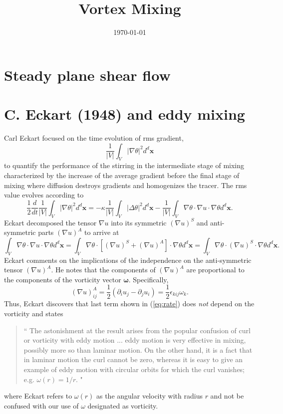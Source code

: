 \documentclass[12pt]{article}
\begin{document}
\title{Vortex Mixing}
\author{}
\date{\today}

\maketitle
\section{Steady plane shear flow}
\section{C. Eckart (1948) and eddy mixing}
Carl Eckart \cite{Eckart1948} focused on the time evolution of rms gradient,
\begin{equation}
\frac{1}{|V|}\int_{V} |\nabla \theta |^{2} d^{d}\mathbf{x}
\end{equation}
to quantify the performance of the stirring in the intermediate stage of mixing characterized by the increase of the average gradient before the final stage of mixing where diffusion destroys gradients and homogenizes the tracer. The rms value evolves according to 
\begin{equation}
\label{eq:rate}
\frac{1}{2}\frac{d}{dt}\frac{1}{|V|}\int_{V} |\nabla \theta |^{2} d^{d}\mathbf{x} = - \kappa \frac{1}{|V|} \int_{V} |\Delta \theta |^{2} d^{d}\mathbf{x}  - \frac{1}{|V|} \int_{V} \nabla \theta \cdot \nabla u \cdot \nabla \theta  d^{d}\mathbf{x}.
\end{equation}
Eckart decomposed the tensor $\nabla u$  into its symmetric $(\nabla u)^{S}$ and anti-symmetric parts $(\nabla u)^{A}$ to arrive at
\begin{equation}
  \int_{V} \nabla \theta \cdot \nabla u \cdot \nabla \theta  d^{d}\mathbf{x} =   \int_{V} \nabla \theta \cdot [(\nabla u)^{S} + (\nabla u)^{A} ] \cdot \nabla \theta  d^{d}\mathbf{x} = \int_{V} \nabla \theta \cdot (\nabla u)^{S}  \cdot \nabla \theta  d^{d}\mathbf{x}.
\end{equation}
Eckart comments on the implications of the independence on the anti-symmetric tensor $(\nabla u)^{A}$. He notes that the components of $(\nabla u)^{A}$ are proportional to the components of the vorticity vector $\mathbf{\omega}$. Specifically, 
\begin{equation}
(\nabla u)^{A}_{ij}=\frac{1}{2}\left(\partial_{i}u_{j}-\partial_{j}u_{i}\right)=\frac{1}{2}\epsilon_{kij}\omega_{k}.
\end{equation}
Thus, Eckart discovers that last term shown in (\ref{eq:rate}) does {\it not} depend on the vorticity and states
\begin{quote}
`` The astonishment at the result arises from the popular confusion of curl or vorticity with eddy motion ...  eddy motion is very effective in mixing, possibly more so than laminar motion. On the other hand, it is a fact that in laminar motion the curl cannot be zero, whereas it is easy to give an example of eddy motion with circular orbits for which the curl vanishes; e.g. $\omega(r) =1/r$. "
\end{quote} 
where Eckart refers to $\omega(r)$ as the angular velocity with radius $r$ and not be confused with our use of $\omega$ designated as vorticity.
\end{document}

